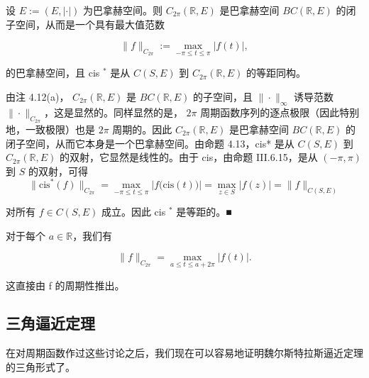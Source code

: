 \begin{corollary}

设  $E := (E, |\cdot|)$ 为巴拿赫空间。则  $C_{2\pi}(\mathbb{R}, E)$ 是巴拿赫空间  $BC(\mathbb{R}, E)$ 的闭子空间，从而是一个具有最大值范数

\[
\|f\|_{C_{2\pi}}:=\max_{-\pi\leq t\leq\pi}|f(t)|,
\]

的巴拿赫空间，且 cis $ ^{*} $ 是从  $C(S,E)$ 到  $C_{2\pi}(\mathbb{R},E)$ 的等距同构。

\proofhead
由注 4.12(a)， $C_{2\pi}(\mathbb{R}, E)$ 是  $BC(\mathbb{R}, E)$ 的子空间，且  $\|\cdot\|_{\infty}$ 诱导范数  $\|\cdot\|_{C_{2\pi}}$，这是显然的。同样显然的是， $2\pi$ 周期函数序列的逐点极限（因此特别地，一致极限）也是  $2\pi$ 周期的。因此  $C_{2\pi}(\mathbb{R}, E)$ 是巴拿赫空间  $BC(\mathbb{R}, E)$ 的闭子空间，从而它本身是一个巴拿赫空间。由命题 4.13，cis* 是从  $C(S, E)$ 到  $C_{2\pi}(\mathbb{R}, E)$ 的双射，它显然是线性的。由于 cis，由命题 III.6.15，是从  $(-\pi, \pi)$ 到  $S$ 的双射，可得
\[
\|\mathrm{c i s}^{*}(f)\|_{C_{2\pi}}=\max_{-\pi\leq t\leq\pi}\left|f\big(\mathrm{c i s}(t)\big)\right|=\max_{z\in S}|f(z)|=\|f\|_{C(S,E)}
\]

对所有  $f \in C(S, E)$ 成立。因此 cis $ ^{*} $ 是等距的。■

\end{corollary}

\begin{remark}

对于每个  $a \in \mathbb{R}$，我们有

\[
\|f\|_{C_{2\pi}}=\max_{a\leq t\leq a+2\pi}|f(t)|.
\]

\proofhead
这直接由 f 的周期性推出。
\end{remark}

\subsection*{三角逼近定理}

在对周期函数作过这些讨论之后，我们现在可以容易地证明魏尔斯特拉斯逼近定理的三角形式了。

